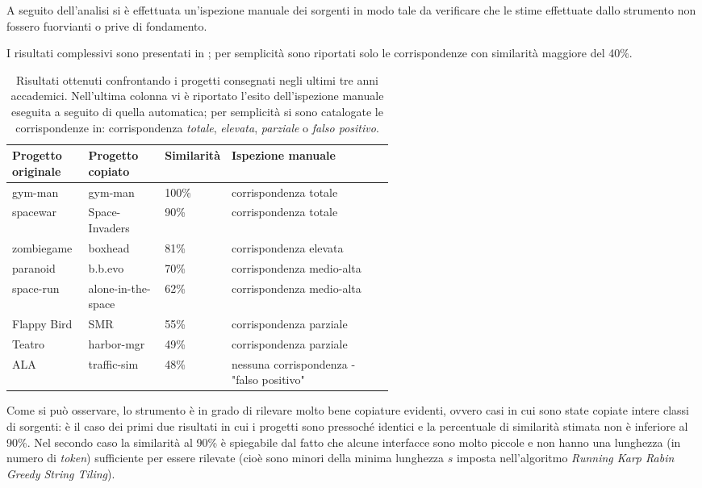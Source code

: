 A seguito dell'analisi si è effettuata un'ispezione manuale dei sorgenti in modo tale da verificare che le stime effettuate dallo strumento non fossero fuorvianti o prive di fondamento.

I risultati complessivi sono presentati in ; per semplicità sono riportati solo le corrispondenze con similarità maggiore del 40\%.

\begin{table}[h!]
    \centering
    \begin{tabular}{|p{0.2\linewidth}|p{0.2\linewidth}|p{0.15\linewidth}|p{}|}
        \hline
        \textbf{Progetto originale} & \textbf{Progetto copiato} & \textbf{Similarità} & \textbf{Ispezione manuale} \\ [0.5ex] 
        \hline\hline
        gym-man & gym-man & 100\% & corrispondenza totale \\
        \hline
        spacewar & Space-Invaders & 90\% & corrispondenza totale \\
        \hline
        zombiegame & boxhead & 81\% & corrispondenza elevata \\
        \hline
        paranoid & b.b.evo & 70\% & corrispondenza medio-alta \\
        \hline
        space-run & alone-in-the-space & 62\% & corrispondenza medio-alta \\
        \hline
        Flappy Bird & SMR & 55\% & corrispondenza parziale \\
        \hline
        Teatro & harbor-mgr & 49\% & corrispondenza parziale \\
        \hline
        ALA & traffic-sim & 48\% & nessuna corrispondenza - "falso positivo" \\
        \hline
    \end{tabular}
    \caption[Risultati ottenuti confrontando i progetti sottomessi negli ultimi tre anni accademici]{Risultati ottenuti confrontando i progetti consegnati negli ultimi tre anni accademici. Nell'ultima colonna vi è riportato l'esito dell'ispezione manuale eseguita a seguito di quella automatica; per semplicità si sono catalogate le corrispondenze in: corrispondenza \textit{totale}, \textit{elevata}, \textit{parziale} o \textit{falso positivo}.}
    \label{table:results}
\end{table}

Come si può osservare, lo strumento è in grado di rilevare molto bene copiature evidenti, ovvero casi in cui sono state copiate intere classi di sorgenti: è il caso dei primi due risultati in cui i progetti sono pressoché identici e la percentuale di similarità stimata non è inferiore al 90\%.
%
Nel secondo caso la similarità al 90\% è spiegabile dal fatto che alcune interfacce sono molto piccole e non hanno una lunghezza (in numero di \textit{token}) sufficiente per essere rilevate (cioè sono minori della minima lunghezza $s$ imposta nell'algoritmo \textit{Running Karp Rabin Greedy String Tiling}).

